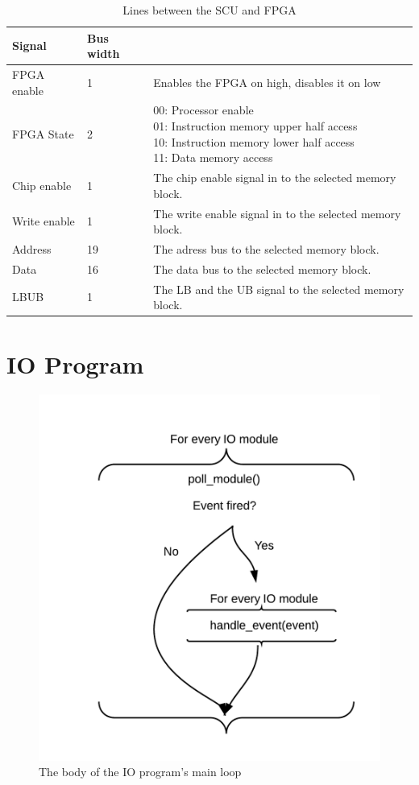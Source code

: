 \begin{table}[H]
    \begin{tabular}{| l | l | l |}
        \hline
        Signal & Bus width & \\
        \hline
        FPGA enable & 1 & Enables the FPGA on high, disables it on low\\
        \hline
        FPGA State & 2 & \pbox{20cm}{00: Processor enable\\01: Instruction memory upper half access\\10: Instruction memory lower half access\\11: Data memory access}\\
        \hline
        Chip enable & 1 & The chip enable signal in to the selected memory block.\\
        \hline
        Write enable & 1 & The write enable signal in to the selected memory block.\\
        \hline
        Address & 19 & The adress bus to the selected memory block.\\
        \hline
        Data & 16 & The data bus to the selected memory block.\\
        \hline
        LBUB & 1 & The LB and the UB signal to the selected memory block.\\
        \hline
    \end{tabular}
    \label{tab:scu-fpga-link}
    \caption{Lines between the SCU and FPGA}
\end{table}

\section{IO Program}
\begin{figure}[H]
    \includegraphics[width=\textwidth]{io/fig/program.png}
    \caption{The body of the IO program's main loop}
\end{figure}


